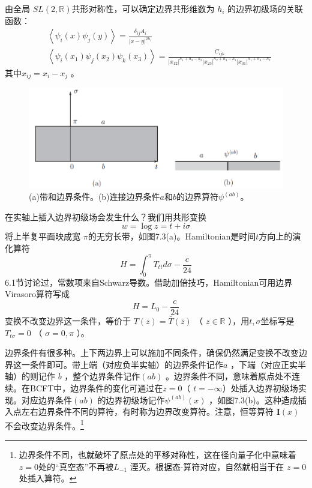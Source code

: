 由全局 $S L(2, \mathbb{R}) $共形对称性，可以确定边界共形维数为 $h_i$ 的边界初级场的关联函数：
\begin{align} &\left\langle\psi_{i}(x) \psi_{j}(y)\right\rangle=\frac{\delta_{i j} A_{i}}{|x-y|^{2 h_{i}}}\\ &\left\langle\psi_{i}\left(x_{1}\right) \psi_{j}\left(x_{2}\right) \psi_{k}\left(x_{3}\right)\right\rangle=\frac{C_{i j k}}{\left|x_{12}\right|^{h_{1}+h_{2}-h_{3}}\left|x_{23}\right|^{h_{2}+h_{3}-h_{1}}\left|x_{31}\right|^{h_{1}+h_{3}-h_{2}}} \end{align}
其中$ x_{i j}=x_{i}-x_{j}$ 。
\begin{figure}[h]
	\centering
	\includegraphics[width=0.6\linewidth]{fig/7.3.png}
	\caption{(a)带和边界条件。(b)连接边界条件$a$和$b$的边界算符$\psi^{(ab)}$。}
\end{figure}

在实轴上插入边界初级场会发生什么？我们用共形变换
\begin{equation}
	w=\log z=t+i \sigma
\end{equation} 
将上半复平面映成宽 $\pi $的无穷长带，如图7.3(a)。Hamiltonian是时间$ t $方向上的演化算符
\begin{equation}
	H=\int_{0}^{\pi} T_{t t} d \sigma-\frac{c}{24}
\end{equation}
6.1节讨论过，常数项来自Schwarz导数。借助加倍技巧，Hamiltonian可用边界Virasoro算符写成
\begin{equation}
	H=L_{0}-\frac{c}{24}
\end{equation} 
变换不改变边界这一条件，等价于 $T(z)=\bar{T}(\bar{z})$ （ $z\in\mathbb{R}$ ），用$ t,\sigma $坐标写是 $T_{t \sigma}=0$ （ $\sigma=0,\pi$ ）。

边界条件有很多种。上下两边界上可以施加不同条件，确保仍然满足变换不改变边界这一条件即可。带上端（对应负半实轴）的边界条件记作$ a$ ，下端（对应正实半轴）的则记作 $b$ ，整个边界条件记作$ (ab)$ 。边界条件不同，意味着原点处不连续。在BCFT中，边界条件的变化可通过在$ z=0 $（ $t=-\infty $）处插入边界初级场实现。对应边界条件$ (ab)$ 的边界初级场记作$ \psi^{(a b)}(x)$ ，如图7.3(b)。这种造成插入点左右边界条件不同的算符，有时称为边界改变算符。注意，恒等算符 $\boldsymbol{I}(x) $不会改变边界条件。\footnote{边界条件不同，也就破坏了原点处的平移对称性，这在径向量子化中意味着 $z=0 $处的“真空态”不再被$ L_{-1}$ 湮灭。根据态-算符对应，自然就相当于在 $z=0 $处插入算符。}

